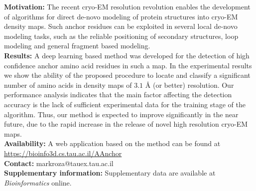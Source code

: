 \textbf{Motivation:}
The recent cryo-EM resolution revolution enables the development of algorithms for  direct de-novo modeling of protein structures into cryo-EM density maps. 
Such anchor residues can be exploited in several local de-novo modeling tasks, such as the reliable positioning of secondary
structures, loop modeling and general fragment based modeling.
\\
\textbf{Results:} 
A deep learning based method was developed for the detection of  high confidence anchor amino acid residues in such a map. 
In the experimental results we show the ability of the proposed procedure to locate and classify a significant number of amino acids in  density maps of $3.1$ {\AA}  (or better) resolution. 
Our performance analysis indicates that the main factor affecting the detection accuracy is the  lack of sufficient experimental data for the training stage of the algorithm.
Thus, our method is expected to improve significantly in the near future, due to the  rapid increase in the release of novel high resolution cryo-EM maps.
\\
\textbf{Availability:} A web application based on the method can be found at \url{https://bioinfo3d.cs.tau.ac.il/AAnchor}\\
\textbf{Contact:} {markroza@tauex.tau.ac.il}\\
\textbf{Supplementary information:} Supplementary data are available at \textit{Bioinformatics}
online.